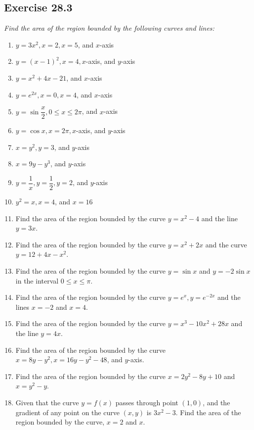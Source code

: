 \documentclass{report}
\begin{document}
\newpage
\subsection{Exercise 28.3}

\noindent \hspace{1.2em}\textit{Find the area of the region bounded by the following curves and lines:}
\begin{enumerate}
    \item $y=3 x^2, x=2, x=5$, and $x$-axis
    \item $y=(x-1)^2, x=4, x$-axis, and $y$-axis
    \item $y=x^2+4 x-21$, and $x$-axis
    \item $y=e^{2 x}, x=0, x=4$, and $x$-axis
    \item $y=\sin \dfrac{x}{2}, 0 \leq x \leq 2 \pi$, and $x$-axis
    \item $y=\cos x, x=2 \pi, x$-axis, and $y$-axis
    \item $x=y^2, y=3$, and $y$-axis
    \item $x=9 y-y^3$, and $y$-axis
    \item $y=\dfrac{1}{x}, y=\dfrac{1}{2}, y=2$, and $y$-axis
    \item $y^2=x, x=4$, and $x=16$
    \item Find the area of the region bounded by the curve $y=x^2-4$ and the line $y=3
              x$.
    \item Find the area of the region bounded by the curve $y=x^2+2 x$ and the curve
          $y=12+4 x-x^2$.
    \item Find the area of the region bounded by the curve $y=\sin x$ and $y=-2 \sin x$
          in the interval $0 \leq x \leq \pi$.
    \item Find the area of the region bounded by the curve $y=e^x, y=e^{-2 x}$ and the
          lines $x=-2$ and $x=4$.
    \item Find the area of the region bounded by the curve $y=x^3-10 x^2+28 x$ and the
          line $y=4 x$.
    \item Find the area of the region bounded by the curve $x=8 y-y^2, x=16 y-y^2-48$,
          and $y$-axis.
    \item Find the area of the region bounded by the curve $x=2 y^2-8 y+10$ and
          $x=y^2-y$.
    \item Given that the curve $y=f(x)$ passes through point $(1,0)$, and the gradient of
          any point on the curve $(x, y)$ is $3 x^2-3$. Find the area of the region
          bounded by the curve, $x=2$ and $x$.
\end{enumerate}
\end{document}
